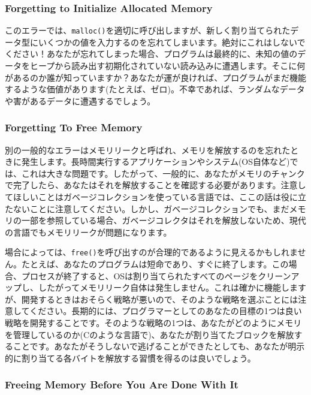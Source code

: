 \hypertarget{forgetting-to-initialize-allocated-memory}{%
\subsubsection*{Forgetting to Initialize Allocated
Memory}\label{forgetting-to-initialize-allocated-memory}}

このエラーでは、\texttt{malloc()}を適切に呼び出しますが、新しく割り当てられたデータ型にいくつかの値を入力するのを忘れてしまいます。絶対にこれはしないでください！あなたが忘れてしまった場合、プログラムは最終的に、未知の値のデータをヒープから読み出す初期化されていない読み込みに遭遇します。そこに何があるのか誰が知っていますか？あなたが運が良ければ、プログラムがまだ機能するような価値があります(たとえば、ゼロ)。不幸であれば、ランダムなデータや害があるデータに遭遇するでしょう。

\hypertarget{forgetting-to-free-memory}{%
\subsubsection*{Forgetting To Free
Memory}\label{forgetting-to-free-memory}}

別の一般的なエラーはメモリリークと呼ばれ、メモリを解放するのを忘れたときに発生します。長時間実行するアプリケーションやシステム(OS自体など)では、これは大きな問題です。したがって、一般的に、あなたがメモリのチャンクで完了したら、あなたはそれを解放することを確認する必要があります。注意してほしいことはガベージコレクションを使っている言語では、ここの話は役に立たないことに注意してください。しかし、ガベージコレクションでも、まだメモリの一部を参照している場合、ガベージコレクタはそれを解放しないため、現代の言語でもメモリリークが問題になります。

場合によっては、\texttt{free()}を呼び出すのが合理的であるように見えるかもしれません。たとえば、あなたのプログラムは短命であり、すぐに終了します。この場合、プロセスが終了すると、OSは割り当てられたすべてのページをクリーンアップし、したがってメモリリーク自体は発生しません。これは確かに機能しますが、開発するときはおそらく戦略が悪いので、そのような戦略を選ぶことには注意してください。長期的には、プログラマーとしてのあなたの目標の1つは良い戦略を開発することです。そのような戦略の1つは、あなたがどのようにメモリを管理しているのか(Cのような言語で)、あなたが割り当てたブロックを解放することです。あなたがそうしないで逃げることができたとしても、あなたが明示的に割り当てる各バイトを解放する習慣を得るのは良いでしょう。

\hypertarget{freeing-memory-before-you-are-done-with-it}{%
\subsubsection*{Freeing Memory Before You Are Done With
It}\label{freeing-memory-before-you-are-done-with-it}}

